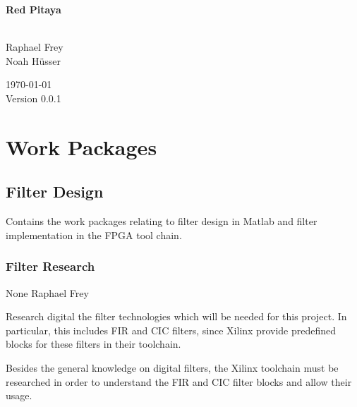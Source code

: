 \documentclass[a4paper,oneside]{alpenspecs/alpenspecs}
\begin{document}
\begin{titlingpage} %
    \flushright\sffamily

    \vspace*{5em}
    \Huge\bfseries{Red Pitaya}\\[1ex]
    \Large{}\\[3ex]

    \normalsize\mdseries

    \vfill
    Raphael Frey\\
    Noah H\"usser\\[3ex]

    \vspace{5em}

    \today\\
    Version 0.0.1
\end{titlingpage} %

\frontmatter %
\tableofcontents*

\mainmatter

\chapter{Work Packages} %
\label{ch:wpac}


\section{Filter Design}
\label{sec:filters}

Contains the  work packages  relating to  filter design  in Matlab  and filter
implementation in the FPGA tool chain.

\subsection{Filter Research}
\label{subsec:filter:research}

\wpac
     {}
     {}
     {}
     {None}
     {}
     {Raphael Frey}
     {%
         Research digital the filter technologies which will be needed for this
         project. In particular, this includes FIR and CIC filters, since Xilinx
         provide predefined blocks for these filters in their toolchain.

         Besides the general knowledge on digital filters, the Xilinx toolchain
         must be researched in order to understand the FIR and CIC filter blocks
         and allow their usage.
     }
\end{document}
